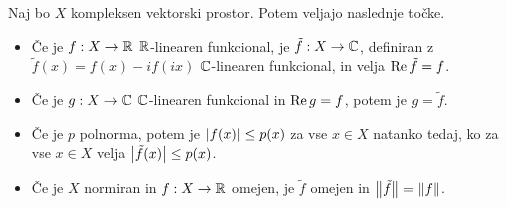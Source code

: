 \begin{lema}
  Naj bo $X$ kompleksen vektorski prostor.
  Potem veljajo naslednje točke.
  \begin{itemize}
  \item Če je $f: X \to \mathbb{R}$ $\mathbb{R}$-linearen funkcional, je $\tilde{f}: X \to \mathbb{C}$,
	definiran z $\tilde{f}(x) = f(x) - i f(ix)$ $\mathbb{C}$-linearen funkcional, in
	velja $\operatorname{Re} \tilde{f} = f$.
  \item Če je $g: X \to \mathbb{C}$ $\mathbb{C}$-linearen funkcional in $\operatorname{Re} g = f$, potem je
	$g = \tilde{f}$.
  \item Če je $p$ polnorma, potem je $\left| f(x) \right| \le p(x)$ za vse $x \in X$
	natanko tedaj, ko za vse $x \in X$ velja $\left| \tilde{f}(x) \right| \le p(x)$.
  \item Če je $X$ normiran in $f: X \to \mathbb{R}$ omejen, je $\tilde{f}$ omejen in
	$\left\lVert\tilde{f}\right\rVert = \left\lVert f\right\rVert$.
  \end{itemize}
\end{lema}


